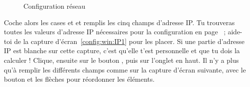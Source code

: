 \noindent
  \begin{figure}[!h]
    \begin{center}  
         	 \caption{Configuration r\'eseau}
    \end{center}
  \end{figure}



Coche alors les cases  et  et remplis les cinq champs d'adresse IP. Tu trouveras toutes les valeurs d'adresse IP n\'ecessaires pour la configuration en page~\pageref{tableau:mon_IP} ; aide-toi de la capture d'\'ecran~\ref{config:win:IP1} pour les placer. Si une partie d'adresse IP est blanche sur cette capture, c'est qu'elle t'est personnelle et que tu dois la calculer !
Clique, ensuite sur le bouton , puis sur l'onglet
 en haut.
Il n'y a plus qu'\`a  remplir les diff\'erents champs comme sur la
capture d'\'ecran suivante, avec le bouton  et les
fl\`eches pour r\'eordonner les \'el\'ements.


